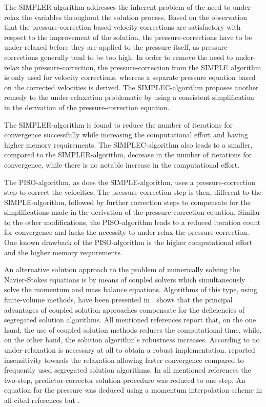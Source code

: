 The SIMPLER-algorithm addresses the inherent problem of the need to under-relax the variables throughout the solution process. Based on the observation that the pressure-correction based velocity-corrections are satisfactory with respect to the improvement of the solution, the pressure-corrections have to be under-relaxed before they are applied to the pressure itself, as pressure-corrections generally tend to be too high. In order to remove the need to under-relax the pressure-correction, the pressure-correction from the SIMPLE algorithm is only used for velocity corrections, whereas a separate pressure equation based on the corrected velocities is derived. The SIMPLEC-algorithm proposes another remedy to the under-relaxation problematic by using a consistent simplification in the derivation of the pressure-correction equation. 

The SIMPLER-algorithm is found to reduce the number of iterations for convergence successfully while increasing the computational effort and having higher memory requirements. The SIMPLEC-algorithm also leads to a smaller, compared to the SIMPLER-algorithm, decrease in the number of iterations for convergence, while there is no notable increase in the computational effort. 

The PISO-algorithm, as does the SIMPLE-algorithm, uses a pressure-correction step to correct the velocities. The pressure-correction step is then, different to the SIMPLE-algorithm, followed by further correction steps to compensate for the simplifications made in the derivation of the pressure-correction equation. Similar to the other modifications, the PISO-algorithm leads to a reduced iteration count for convergence and lacks the necessity to under-relax the pressure-correction. One known drawback of the PISO-algorithm is the higher computational effort and the higher memory requirements.

An alternative solution approach to the problem of numerically solving the Navier-Stokes equations is by means of coupled solvers which simultaneously solve the momentum and mass balance equations. Algorithms of this type, using finite-volume methods, have been presented in \cite{chen10,darwish09,falk13,galpin86,klaij13,mangani14,vakilipour12}. \cite{darwish09} shows that the principal advantages of coupled solution approaches compensate for the deficiencies of segregated solution algorithms. All mentioned references report that, on the one hand, the use of coupled solution methods reduces the computational time, while, on the other hand, the solution algorithm's robustness increases. According to \cite{darwish09} no under-relaxation is necessary at all to obtain a robust implementation. \cite{galpin86} reported insensitivity towards the relaxation allowing faster convergence compared to frequently used segregated solution algorithms. In all mentioned references the two-step, predictor-corrector solution procedure was reduced to one step. An equation for the pressure was deduced using a momentum interpolation scheme \cite{rhie82} in all cited references but \cite{galpin86}.

